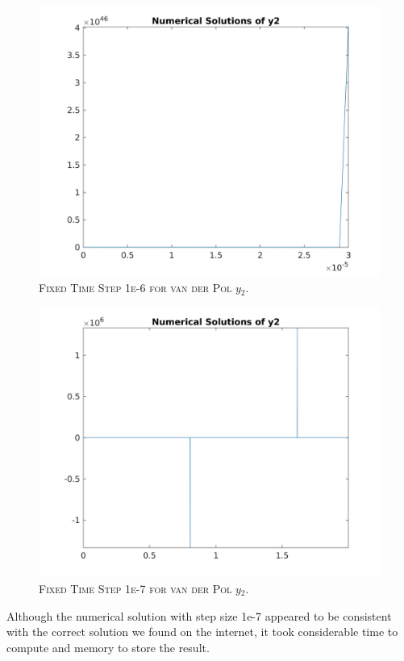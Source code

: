 \documentclass[a4paper,oneside]{book}
\numberwithin{equation}{chapter}
\begin{document}
\begin{figure}[H]
\centering 
\includegraphics[scale=0.18]{fts_vdp_y2_1e-6_nl}
\caption{\textsc{Fixed Time Step 1e-6 for van der Pol $y_2$.}}
\end{figure}
\begin{figure}[H]
\centering 
\includegraphics[scale=0.18]{fts_vdp_y2_1e-7_nl}
\caption{\textsc{Fixed Time Step 1e-7 for van der Pol $y_2$.}}
\end{figure}
Although the numerical solution with step size 1e-7  appeared to be consistent with the correct solution we found on the internet, it took considerable time to compute and memory to store the result.
\end{document}
